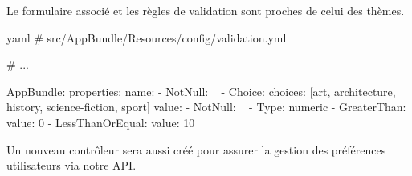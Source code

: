 \documentclass[big]{zmdocument}
\begin{document}
Le formulaire associé et les règles de validation sont proches de celui des thèmes.






\begin{CodeBlock}{yaml}
# src/AppBundle/Resources/config/validation.yml

# ...

AppBundle\Entity\Preference:
    properties:
        name:
            - NotNull: ~
            - Choice:
                choices: [art, architecture, history, science-fiction, sport]
        value:
            - NotNull: ~
            - Type: numeric
            - GreaterThan:
                value: 0
            - LessThanOrEqual:
                value: 10
\end{CodeBlock}



Un nouveau contrôleur sera aussi créé pour assurer la gestion des préférences utilisateurs via notre API.
\end{document}
